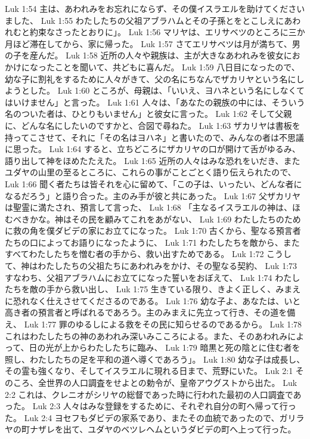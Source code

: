 Luk 1:54  主は、あわれみをお忘れにならず、その僕イスラエルを助けてくださいました、
Luk 1:55  わたしたちの父祖アブラハムとその子孫とをとこしえにあわれむと約束なさったとおりに」。
Luk 1:56  マリヤは、エリサベツのところに三か月ほど滞在してから、家に帰った。
Luk 1:57  さてエリサベツは月が満ちて、男の子を産んだ。
Luk 1:58  近所の人々や親族は、主が大きなあわれみを彼女におかけになったことを聞いて、共どもに喜んだ。
Luk 1:59  八日目になったので、幼な子に割礼をするために人々がきて、父の名にちなんでザカリヤという名にしようとした。
Luk 1:60  ところが、母親は、「いいえ、ヨハネという名にしなくてはいけません」と言った。
Luk 1:61  人々は、「あなたの親族の中には、そういう名のついた者は、ひとりもいません」と彼女に言った。
Luk 1:62  そして父親に、どんな名にしたいのですかと、合図で尋ねた。
Luk 1:63  ザカリヤは書板を持ってこさせて、それに「その名はヨハネ」と書いたので、みんなの者は不思議に思った。
Luk 1:64  すると、立ちどころにザカリヤの口が開けて舌がゆるみ、語り出して神をほめたたえた。
Luk 1:65  近所の人々はみな恐れをいだき、またユダヤの山里の至るところに、これらの事がことごとく語り伝えられたので、
Luk 1:66  聞く者たちは皆それを心に留めて、「この子は、いったい、どんな者になるだろう」と語り合った。主のみ手が彼と共にあった。
Luk 1:67  父ザカリヤは聖霊に満たされ、預言して言った、
Luk 1:68  「主なるイスラエルの神は、ほむべきかな。神はその民を顧みてこれをあがない、
Luk 1:69  わたしたちのために救の角を僕ダビデの家にお立てになった。
Luk 1:70  古くから、聖なる預言者たちの口によってお語りになったように、
Luk 1:71  わたしたちを敵から、またすべてわたしたちを憎む者の手から、救い出すためである。
Luk 1:72  こうして、神はわたしたちの父祖たちにあわれみをかけ、その聖なる契約、
Luk 1:73  すなわち、父祖アブラハムにお立てになった誓いをおぼえて、
Luk 1:74  わたしたちを敵の手から救い出し、
Luk 1:75  生きている限り、きよく正しく、みまえに恐れなく仕えさせてくださるのである。
Luk 1:76  幼な子よ、あなたは、いと高き者の預言者と呼ばれるであろう。主のみまえに先立って行き、その道を備え、
Luk 1:77  罪のゆるしによる救をその民に知らせるのであるから。
Luk 1:78  これはわたしたちの神のあわれみ深いみこころによる。また、そのあわれみによって、日の光が上からわたしたちに臨み、
Luk 1:79  暗黒と死の陰とに住む者を照し、わたしたちの足を平和の道へ導くであろう」。
Luk 1:80  幼な子は成長し、その霊も強くなり、そしてイスラエルに現れる日まで、荒野にいた。
Luk 2:1  そのころ、全世界の人口調査をせよとの勅令が、皇帝アウグストから出た。
Luk 2:2  これは、クレニオがシリヤの総督であった時に行われた最初の人口調査であった。
Luk 2:3  人々はみな登録をするために、それぞれ自分の町へ帰って行った。
Luk 2:4  ヨセフもダビデの家系であり、またその血統であったので、ガリラヤの町ナザレを出て、ユダヤのベツレヘムというダビデの町へ上って行った。
